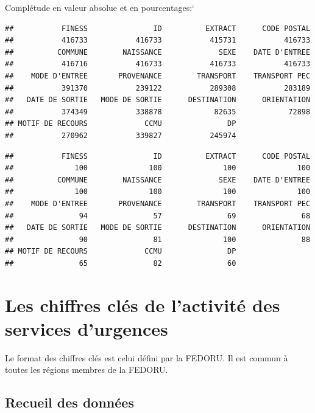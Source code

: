 \documentclass[]{article}
\begin{document}
Complétude en valeur absolue et en pourcentages:`

\begin{verbatim}
##           FINESS               ID          EXTRACT      CODE POSTAL 
##           416733           416733           415731           416733 
##          COMMUNE        NAISSANCE             SEXE    DATE D'ENTREE 
##           416716           416733           416733           416733 
##    MODE D'ENTREE       PROVENANCE        TRANSPORT    TRANSPORT PEC 
##           391370           239122           289308           283189 
##   DATE DE SORTIE   MODE DE SORTIE      DESTINATION      ORIENTATION 
##           374349           338878            82635            72898 
## MOTIF DE RECOURS             CCMU               DP 
##           270962           339827           245974
\end{verbatim}

\begin{verbatim}
##           FINESS               ID          EXTRACT      CODE POSTAL 
##              100              100              100              100 
##          COMMUNE        NAISSANCE             SEXE    DATE D'ENTREE 
##              100              100              100              100 
##    MODE D'ENTREE       PROVENANCE        TRANSPORT    TRANSPORT PEC 
##               94               57               69               68 
##   DATE DE SORTIE   MODE DE SORTIE      DESTINATION      ORIENTATION 
##               90               81              100               88 
## MOTIF DE RECOURS             CCMU               DP 
##               65               82               60
\end{verbatim}

\section{Les chiffres clés de l'activité des services
d'urgences}\label{les-chiffres-cles-de-lactivite-des-services-durgences}

Le format des chiffres clés est celui défini par la FEDORU. Il est
commun à toutes les régions membres de la FEDORU.

\subsection{Recueil des données}\label{recueil-des-donnees}
\end{document}
